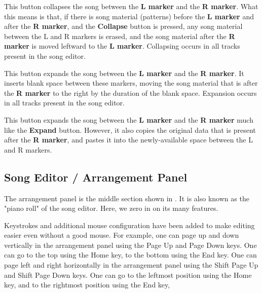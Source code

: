    This button collapses the song between the \textbf{L marker} and the
   \textbf{R marker}.
   What this means is that, if there is song material (patterns) before the
   \textbf{L marker} and after the \textbf{R marker},
   and the \textbf{Collapse} button is
   pressed, any song material between the L and R markers is erased, and
   the song material after the \textbf{R marker} is moved leftward to
   the \textbf{L marker}.
   Collapsing occurs in all tracks present in the song editor.

   This button expands the song between the
   \textbf{L marker} and the \textbf{R marker}.
   It inserts blank space between these markers, moving the song material
   that is after the \textbf{R marker}
   to the right by the duration of the blank space.
   Expansion occurs in all tracks present in the song editor.

   This button expands the song between the \textbf{L marker} and the
   \textbf{R marker} much like the \textbf{Expand} button.
   However, it also copies the original data that is present after the
   \textbf{R marker}, and pastes it into the newly-available space between
   the L and R markers.

\subsection{Song Editor / Arrangement Panel}
\label{subsec:seq66_song_editor_arrangement_panel}

   The arrangement panel is the middle section shown in
   .  It is also known as the
   "piano roll" of the song editor. Here, we zero in on its many
   features.

   Keystrokes and additional mouse configuration have been added to make
   editing easier even without a good mouse.
   For example, one can page up and down vertically in the arrangement
   panel using the
    Page Up and 
    Page Down keys.
   One can go to the top using the 
    Home key,
   to the bottom using the
    End key.
   One can page left and right horizontally in the arrangement
   panel using the
    Shift Page Up and 
    Shift Page Down keys.
   One can go to the leftmost position using the 
    Home key,
   and to the rightmost position using the
    End key,

